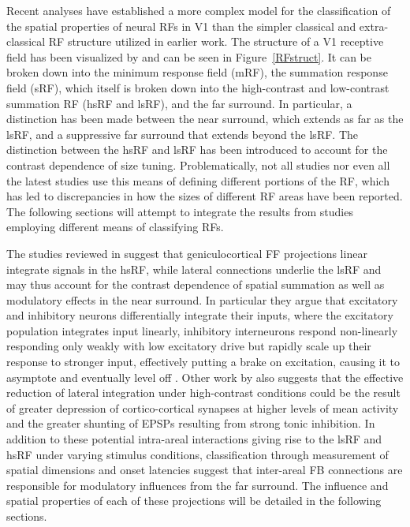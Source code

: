 Recent analyses have established a more complex model for the
classification of the spatial properties of neural RFs in V1 than the
simpler classical and extra-classical RF structure utilized in earlier
work. The structure of a V1 receptive field has been visualized by
\cite{Angelucci2006a} and can be seen in Figure~\ref{RFstruct}. It can
be broken down into the minimum response field (mRF), the summation
response field (sRF), which itself is broken down into the
high-contrast and low-contrast summation RF (hsRF and lsRF), and the
far surround. In particular, a distinction has been made between the
near surround, which extends as far as the lsRF, and a suppressive far
surround that extends beyond the lsRF. The distinction between the
hsRF and lsRF has been introduced to account for the contrast
dependence of size tuning. Problematically, not all studies nor even
all the latest studies use this means of defining different portions
of the RF, which has led to discrepancies in how the sizes of
different RF areas have been reported. The following sections will
attempt to integrate the results from studies employing different
means of classifying RFs.

The studies reviewed in \cite{Angelucci2006a} suggest that
geniculocortical FF projections linear integrate signals in the hsRF,
while lateral connections underlie the lsRF and may thus account for
the contrast dependence of spatial summation as well as modulatory
effects in the near surround. In particular they argue that excitatory
and inhibitory neurons differentially integrate their inputs, where
the excitatory population integrates input linearly, inhibitory
interneurons respond non-linearly responding only weakly with low
excitatory drive but rapidly scale up their response to stronger
input, effectively putting a brake on excitation, causing it to
asymptote and eventually level off \citep{Angelucci2002}. Other work
by \cite{Sceniak1999} also suggests that the effective reduction of
lateral integration under high-contrast conditions could be the result
of greater depression of cortico-cortical synapses at higher levels of
mean activity and the greater shunting of EPSPs resulting from strong
tonic inhibition. In addition to these potential intra-areal
interactions giving rise to the lsRF and hsRF under varying stimulus
conditions, classification through measurement of spatial dimensions
and onset latencies suggest that inter-areal FB connections are
responsible for modulatory influences from the far surround. The
influence and spatial properties of each of these projections will be
detailed in the following sections.

